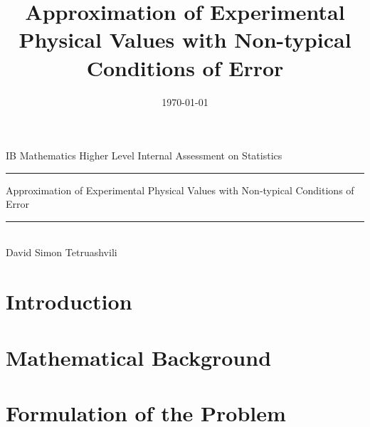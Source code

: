 \documentclass[a4paper]{article}
\title{Approximation of Experimental Physical Values with Non-typical Conditions of Error}
\date{\today}
\numberwithin{equation}{subsection}
\begin{document}
\begin{titlepage}
\begin{center}
IB Mathematics Higher Level Internal Assessment on Statistics 
\\ 
\rule{\textwidth}{0.25pt}
\linebreak
\Huge{Approximation of Experimental Physical Values with Non-typical Conditions of Error}
\rule{\textwidth}{0.25pt} \\
[15cm]
\large {David Simon Tetruashvili} \\

\end{center}
\end{titlepage}
\newpage

\tableofcontents
{}
\newpage

\section{Introduction}

\section{Mathematical Background}

\section{Formulation of the Problem}
\end{document}
